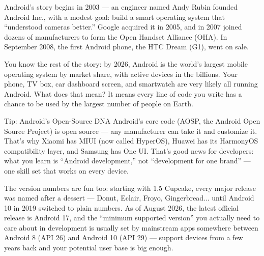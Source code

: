 


Android's story begins in 2003 — an engineer named Andy Rubin founded Android Inc., with a modest goal: build a smart operating system that “understood cameras better.” Google acquired it in 2005, and in 2007 joined dozens of manufacturers to form the Open Handset Alliance (OHA). In September 2008, the first Android phone, the HTC Dream (G1), went on sale.

You know the rest of the story: by 2026, Android is the world's largest mobile operating system by market share, with active devices in the billions. Your phone, TV box, car dashboard screen, and smartwatch are very likely all running Android. What does that mean? It means every line of code you write has a chance to be used by the largest number of people on Earth.

\begin{tcbinfo}{Tip: Android's Open-Source DNA}
Android's core code (AOSP, the Android Open Source Project) is open source — any manufacturer can take it and customize it. That's why Xiaomi has MIUI (now called HyperOS), Huawei has its HarmonyOS compatibility layer, and Samsung has One UI. That's good news for developers: what you learn is “Android development,” not “development for one brand” — one skill set that works on every device.

\end{tcbinfo}

The version numbers are fun too: starting with 1.5 Cupcake, every major release was named after a dessert — Donut, Eclair, Froyo, Gingerbread... until Android 10 in 2019 switched to plain numbers. As of August 2026, the latest official release is Android 17, and the “minimum supported version” you actually need to care about in development is usually set by mainstream apps somewhere between Android 8 (API 26) and Android 10 (API 29) — support devices from a few years back and your potential user base is big enough.

